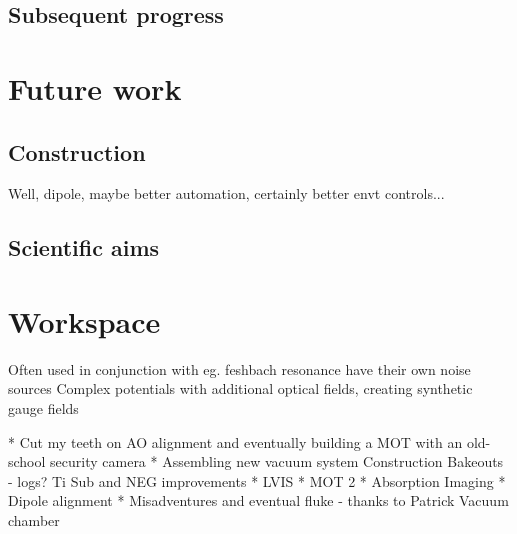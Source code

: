\subsection{Subsequent progress}
\section{Future work}
\subsection*{Construction}

Well, dipole, maybe better automation, certainly better envt controls... 
\subsection*{Scientific aims}

\section*{Workspace}


		
	Often used in conjunction with eg. feshbach resonance 
	have their own noise sources
		\cite{pichler10}%
	Complex potentials with additional optical fields, creating synthetic gauge fields
		\cite{aidelsburger11,aidelsburger13,miyake13}


* Cut my teeth on AO alignment and eventually building
a MOT with an old-school security camera * Assembling new vacuum system
Construction Bakeouts - logs? Ti Sub and NEG improvements * LVIS * MOT 2
* Absorption Imaging * Dipole alignment * Misadventures and eventual
fluke - thanks to Patrick
Vacuum chamber


